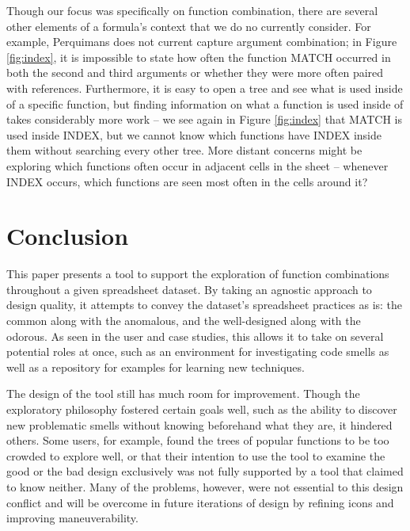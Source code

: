 \documentclass[conference]{IEEEtran}
\newcommand{\toolname}{Perquimans } \newcommand{\toolnameend}{Perquimans}
\begin{document}
	Though our focus was specifically on function combination, there are several
	other elements of a formula's context that we do no currently consider. For
	example, \toolname does not current capture argument combination; in Figure
	\ref{fig:index}, it is impossible to state how often the function MATCH
	occurred in both the second and third arguments or whether they were more often
	paired with references. Furthermore, it is easy to open a tree and see what is
	used inside of a specific function, but finding information on what a function
	is used inside of takes considerably more work -- we see again in Figure
	\ref{fig:index} that MATCH is used inside INDEX, but we cannot know which
	functions have INDEX inside them without searching every other tree. More
	distant concerns might be exploring which functions often occur in adjacent
	cells in the sheet -- whenever INDEX occurs, which functions are seen most
	often in the cells around it?
	
	
	
	
	\section{Conclusion} This paper presents a tool to support the exploration of
	function combinations throughout a given spreadsheet dataset. By taking an
	agnostic approach to design quality, it attempts to convey the dataset's
	spreadsheet practices as is: the common along with the anomalous, and the
	well-designed along with the odorous. As seen in the user and case studies,
	this allows it to take on several potential roles at once, such as an
	environment for investigating code smells as well as a repository for examples
	for learning new techniques. \par
	
	The design of the tool still has much room for improvement. Though the
	exploratory philosophy fostered certain goals well, such as the ability to
	discover new problematic smells without knowing beforehand what they are, it
	hindered others. Some users, for example, found the trees of popular functions
	to be too crowded to explore well, or that their intention to use the tool to
	examine the good or the bad design exclusively was not fully supported by a
	tool that claimed to know neither. Many of the problems, however, were not
	essential to this design conflict and will be overcome in future iterations of
	design by refining icons and improving maneuverability. \par
	
\end{document}
